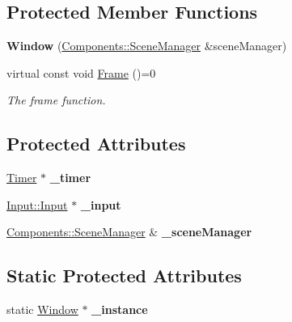 \subsection*{Protected Member Functions}
\begin{DoxyCompactItemize}
\item 
{\bfseries Window} (\hyperlink{class_ensum_1_1_components_1_1_scene_manager}{Components\+::\+Scene\+Manager} \&scene\+Manager)\hypertarget{class_ensum_1_1_core_1_1_window_a64e2b8f8d5728eb941f54cc1577fcb0a}{}\label{class_ensum_1_1_core_1_1_window_a64e2b8f8d5728eb941f54cc1577fcb0a}

\item 
virtual const void \hyperlink{class_ensum_1_1_core_1_1_window_a58af9c1b06e0fe12820f584f4638ae15}{Frame} ()=0
\begin{DoxyCompactList}\small\item\em The frame function. \end{DoxyCompactList}\end{DoxyCompactItemize}
\subsection*{Protected Attributes}
\begin{DoxyCompactItemize}
\item 
\hyperlink{class_ensum_1_1_core_1_1_timer}{Timer} $\ast$ {\bfseries \+\_\+timer}\hypertarget{class_ensum_1_1_core_1_1_window_aa27d25534350ec8e46cf2eae67c82ea5}{}\label{class_ensum_1_1_core_1_1_window_aa27d25534350ec8e46cf2eae67c82ea5}

\item 
\hyperlink{class_ensum_1_1_input_1_1_input}{Input\+::\+Input} $\ast$ {\bfseries \+\_\+input}\hypertarget{class_ensum_1_1_core_1_1_window_a6b2925a490f7a5a2417059660713bc19}{}\label{class_ensum_1_1_core_1_1_window_a6b2925a490f7a5a2417059660713bc19}

\item 
\hyperlink{class_ensum_1_1_components_1_1_scene_manager}{Components\+::\+Scene\+Manager} \& {\bfseries \+\_\+scene\+Manager}\hypertarget{class_ensum_1_1_core_1_1_window_a19281ff51aee4c5bd8a71f7a00786930}{}\label{class_ensum_1_1_core_1_1_window_a19281ff51aee4c5bd8a71f7a00786930}

\end{DoxyCompactItemize}
\subsection*{Static Protected Attributes}
\begin{DoxyCompactItemize}
\item 
static \hyperlink{class_ensum_1_1_core_1_1_window}{Window} $\ast$ {\bfseries \+\_\+instance}\hypertarget{class_ensum_1_1_core_1_1_window_aa4ca94e77186512ab2949dd6c7e850e6}{}\label{class_ensum_1_1_core_1_1_window_aa4ca94e77186512ab2949dd6c7e850e6}

\end{DoxyCompactItemize}


